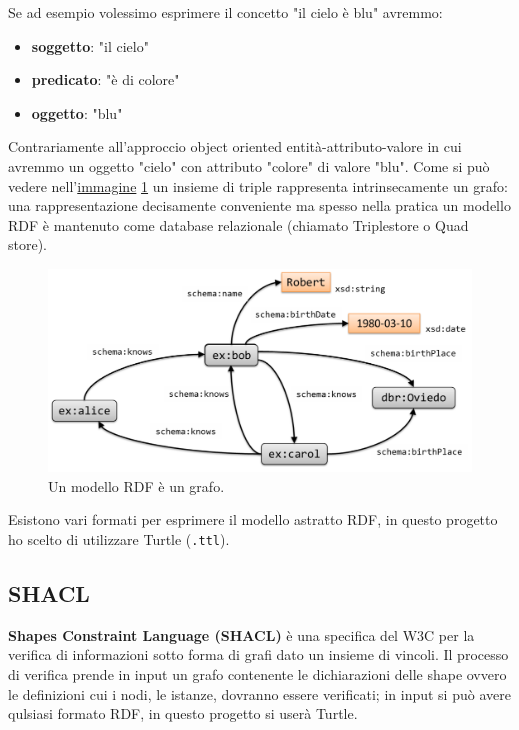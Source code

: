 \documentclass{article}
\begin{document}
Se ad esempio volessimo esprimere il concetto "il cielo è blu" avremmo:
\begin{itemize}
    \item [] \textbf{soggetto}: "il cielo"
    \item [] \textbf{predicato}: "è di colore"
    \item [] \textbf{oggetto}: "blu"
\end{itemize}

Contrariamente all'approccio object oriented entità-attributo-valore in cui avremmo un oggetto "cielo" con attributo "colore" di valore "blu". Come si può vedere nell'\href{https://book.validatingrdf.com/bookHtml008.html}{immagine} \ref{fig:graph} un insieme di triple rappresenta intrinsecamente un grafo: una rappresentazione decisamente conveniente ma spesso nella pratica un modello RDF è mantenuto come database relazionale (chiamato Triplestore o Quad store).

\begin{figure}[h!t]
    \caption{Un modello RDF è un grafo.}
    \label{fig:graph}
    \includegraphics[scale=0.3]{images/RDFGraph.png}
    \centering
\end{figure}

Esistono vari formati per esprimere il modello astratto RDF, in questo progetto ho scelto di utilizzare Turtle (\texttt{.ttl}).

\subsection{SHACL}
\textbf{Shapes Constraint Language (SHACL)} è una specifica del W3C per la verifica di informazioni sotto forma di grafi dato un insieme di vincoli. Il processo di verifica prende in input un grafo contenente le dichiarazioni delle shape ovvero le definizioni cui i nodi, le istanze, dovranno essere verificati; in input si può avere qulsiasi formato RDF, in questo progetto si userà Turtle. 
\end{document}
